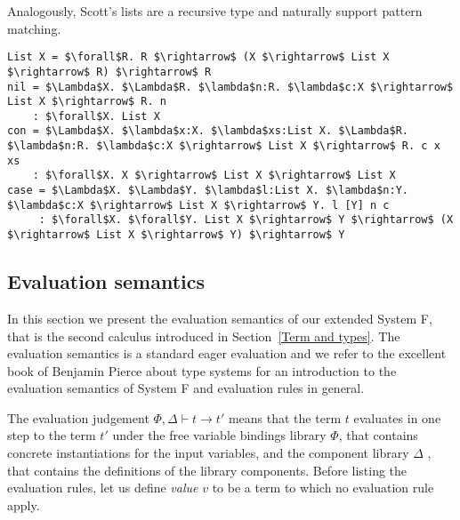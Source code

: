 Analogously, Scott's lists are a recursive type and naturally support pattern matching.
\begin{lstlisting}[style=plain, mathescape]
List X = $\forall$R. R $\rightarrow$ (X $\rightarrow$ List X $\rightarrow$ R) $\rightarrow$ R
nil = $\Lambda$X. $\Lambda$R. $\lambda$n:R. $\lambda$c:X $\rightarrow$ List X $\rightarrow$ R. n
    : $\forall$X. List X
con = $\Lambda$X. $\lambda$x:X. $\lambda$xs:List X. $\Lambda$R. $\lambda$n:R. $\lambda$c:X $\rightarrow$ List X $\rightarrow$ R. c x xs
    : $\forall$X. X $\rightarrow$ List X $\rightarrow$ List X
case = $\Lambda$X. $\Lambda$Y. $\lambda$l:List X. $\lambda$n:Y. $\lambda$c:X $\rightarrow$ List X $\rightarrow$ Y. l [Y] n c
     : $\forall$X. $\forall$Y. List X $\rightarrow$ Y $\rightarrow$ (X $\rightarrow$ List X $\rightarrow$ Y) $\rightarrow$ Y
\end{lstlisting} 
 
  \subsection{Evaluation semantics}
In this section we present the evaluation semantics of our extended System F, that is the second calculus introduced in Section~\ref{Term and types}. The evaluation semantics is a standard eager evaluation and we refer to the excellent book of Benjamin Pierce about type systems \cite{pierce2002types} for an introduction to the evaluation semantics of System F and evaluation rules in general.

The evaluation judgement $\Phi, \Delta \vdash t \longrightarrow t'$ means that the term $t$ evaluates in one step to the term $t'$ under the free variable bindings library $\Phi$, that contains concrete instantiations for the input variables, and the component library $\Delta$ , that contains the definitions of the library components. Before listing the evaluation rules, let us define \emph{value} $v$ to be a term to which no evaluation rule apply.

\begin{prooftree}
\end{prooftree}

\begin{prooftree}
\end{prooftree}

\begin{prooftree}
\end{prooftree}


